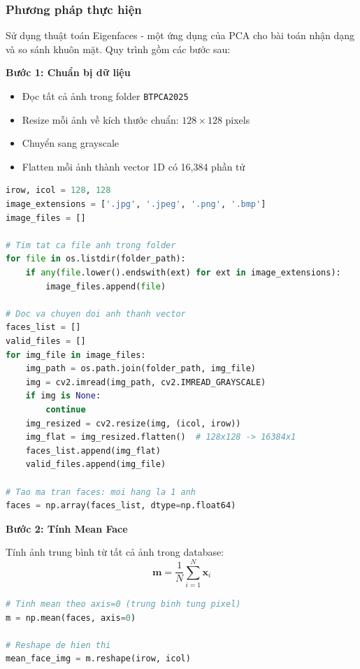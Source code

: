 \subsubsection{Phương pháp thực hiện}

Sử dụng thuật toán Eigenfaces - một ứng dụng của PCA cho bài toán nhận dạng và so sánh khuôn mặt. Quy trình gồm các bước sau:

\textbf{Bước 1: Chuẩn bị dữ liệu}

\begin{itemize}
    \item Đọc tất cả ảnh trong folder \texttt{BTPCA2025}
    \item Resize mỗi ảnh về kích thước chuẩn: $128 \times 128$ pixels
    \item Chuyển sang grayscale
    \item Flatten mỗi ảnh thành vector 1D có 16,384 phần tử
\end{itemize}
\begin{lstlisting}[language=Python]
irow, icol = 128, 128
image_extensions = ['.jpg', '.jpeg', '.png', '.bmp']
image_files = []

# Tim tat ca file anh trong folder
for file in os.listdir(folder_path):
    if any(file.lower().endswith(ext) for ext in image_extensions):
        image_files.append(file)

# Doc va chuyen doi anh thanh vector
faces_list = []
valid_files = []
for img_file in image_files:
    img_path = os.path.join(folder_path, img_file)
    img = cv2.imread(img_path, cv2.IMREAD_GRAYSCALE) 
    if img is None:
        continue   
    img_resized = cv2.resize(img, (icol, irow))
    img_flat = img_resized.flatten()  # 128x128 -> 16384x1
    faces_list.append(img_flat)
    valid_files.append(img_file)

# Tao ma tran faces: moi hang la 1 anh
faces = np.array(faces_list, dtype=np.float64)
\end{lstlisting}

\textbf{Bước 2: Tính Mean Face}

Tính ảnh trung bình từ tất cả ảnh trong database:
\begin{equation}
    \mathbf{m} = \frac{1}{N} \sum_{i=1}^{N} \mathbf{x}_i
\end{equation}
\begin{lstlisting}[language=Python]
# Tinh mean theo axis=0 (trung binh tung pixel)
m = np.mean(faces, axis=0)

# Reshape de hien thi
mean_face_img = m.reshape(irow, icol)
\end{lstlisting}

